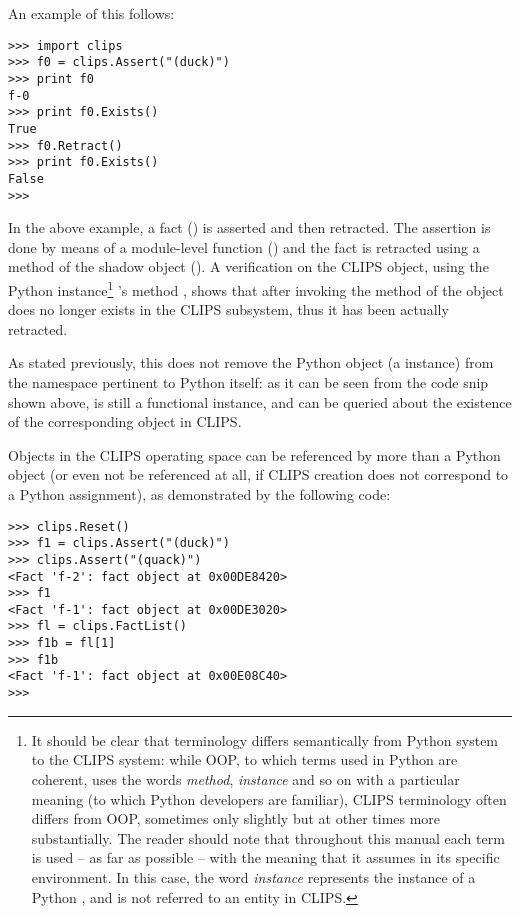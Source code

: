 An example of this follows:

\begin{verbatim}
>>> import clips
>>> f0 = clips.Assert("(duck)")
>>> print f0
f-0
>>> print f0.Exists()
True
>>> f0.Retract()
>>> print f0.Exists()
False
>>>
\end{verbatim}

In the above example, a fact () is asserted and then
retracted. The assertion is done by means of a module-level function
() and the fact is retracted using a method of the
shadow object (). A verification on the CLIPS  object,
using the Python  instance\footnote{It should be clear
that terminology differs semantically from Python system to the CLIPS
system: while OOP, to which terms used in Python are coherent, uses
the words \emph{method}, \emph{instance} and so on with a particular
meaning (to which Python developers are familiar), CLIPS terminology
often differs from OOP, sometimes only slightly but at other times more
substantially. The reader should note that throughout this manual
each term is used -- as far as possible -- with the meaning that it
assumes in its specific environment. In this case, the word
\emph{instance} represents the instance of a Python ,
and is not referred to an entity in CLIPS.} 's method
, shows that after invoking the 
method of  the  object does no longer exists in the
CLIPS subsystem, thus it has been actually retracted.

As stated previously, this does not remove the Python object
(a  instance) from the namespace pertinent to Python itself:
as it can be seen from the code snip shown above,  is still a
functional instance, and can be queried about the existence of the
corresponding object in CLIPS.

Objects in the CLIPS operating space can be referenced by more than a
Python object (or even not be referenced at all, if CLIPS creation does
not correspond to a Python assignment), as demonstrated by the following
code:

\begin{verbatim}
>>> clips.Reset()
>>> f1 = clips.Assert("(duck)")
>>> clips.Assert("(quack)")
<Fact 'f-2': fact object at 0x00DE8420>
>>> f1
<Fact 'f-1': fact object at 0x00DE3020>
>>> fl = clips.FactList()
>>> f1b = fl[1]
>>> f1b
<Fact 'f-1': fact object at 0x00E08C40>
>>>
\end{verbatim}

